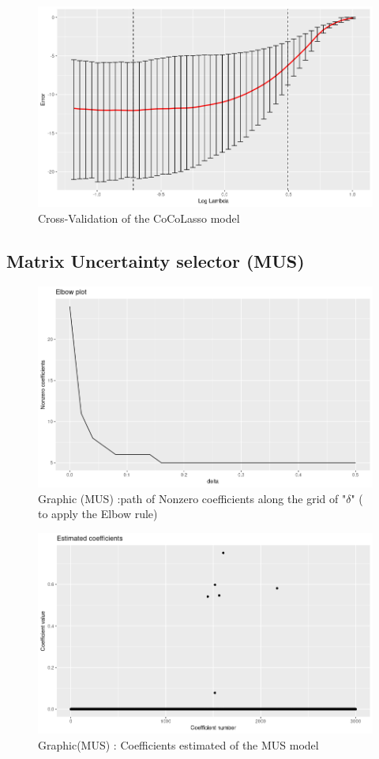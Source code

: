 \documentclass{report}
\begin{document}
\begin{figure}[H]
	\centering
		\includegraphics[scale=0.5]{pictures/msecocol.png}
	\caption{Cross-Validation of the CoCoLasso model}
	\label{t12}
\end{figure}

\subsection{Matrix Uncertainty selector (MUS) }
\begin{figure}[H]
	\centering
		\includegraphics[scale=0.5]{pictures/nzcmus.png}
	\caption{Graphic (MUS) :path of Nonzero coefficients along the grid of "$\delta$"  ( to apply the Elbow rule)}
	\label{t13}
\end{figure}

\begin{figure}[H]
	\centering
		\includegraphics[scale=0.5]{pictures/cemus.png}
	\caption{Graphic(MUS) : Coefficients estimated of the MUS model }
	\label{t14}
\end{figure}
\end{document}
